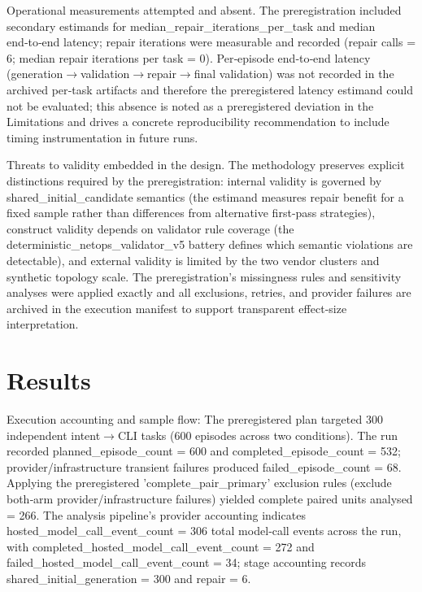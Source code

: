 \documentclass[conference]{IEEEtran}
\begin{document}
Operational measurements attempted and absent.  The preregistration included secondary estimands for median\_repair\_iterations\_per\_task and median end‑to‑end latency; repair iterations were measurable and recorded (repair calls = 6; median repair iterations per task = 0). Per‑episode end‑to‑end latency (generation\ensuremath{\rightarrow}validation\ensuremath{\rightarrow}repair\ensuremath{\rightarrow}final validation) was not recorded in the archived per‑task artifacts and therefore the preregistered latency estimand could not be evaluated; this absence is noted as a preregistered deviation in the Limitations and drives a concrete reproducibility recommendation to include timing instrumentation in future runs.

Threats to validity embedded in the design.  The methodology preserves explicit distinctions required by the preregistration: internal validity is governed by shared\_initial\_candidate semantics (the estimand measures repair benefit for a fixed sample rather than differences from alternative first‑pass strategies), construct validity depends on validator rule coverage (the deterministic\_netops\_validator\_v5 battery defines which semantic violations are detectable), and external validity is limited by the two vendor clusters and synthetic topology scale. The preregistration's missingness rules and sensitivity analyses were applied exactly and all exclusions, retries, and provider failures are archived in the execution manifest to support transparent effect‑size interpretation.

\section{Results}
Execution accounting and sample flow: The preregistered plan targeted 300 independent intent\ensuremath{\rightarrow}CLI tasks (600 episodes across two conditions). The run recorded planned\_episode\_count = 600 and completed\_episode\_count = 532; provider/infrastructure transient failures produced failed\_episode\_count = 68. Applying the preregistered 'complete\_pair\_primary' exclusion rules (exclude both‑arm provider/infrastructure failures) yielded complete paired units analysed = 266. The analysis pipeline's provider accounting indicates hosted\_model\_call\_event\_count = 306 total model‑call events across the run, with completed\_hosted\_model\_call\_event\_count = 272 and failed\_hosted\_model\_call\_event\_count = 34; stage accounting records shared\_initial\_generation = 300 and repair = 6.
\end{document}
